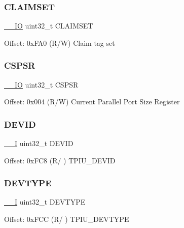\subsubsection{\texorpdfstring{CLAIMSET}{CLAIMSET}}
{\footnotesize\ttfamily \mbox{\hyperlink{core__sc300_8h_aec43007d9998a0a0e01faede4133d6be}{\+\_\+\+\_\+\+IO}} uint32\+\_\+t C\+L\+A\+I\+M\+S\+ET}

Offset\+: 0x\+F\+A0 (R/W) Claim tag set \mbox{\label{struct_t_p_i___type_a473c1ca66cec890b536d9c9a13a2d8c2}} 
\subsubsection{\texorpdfstring{CSPSR}{CSPSR}}
{\footnotesize\ttfamily \mbox{\hyperlink{core__sc300_8h_aec43007d9998a0a0e01faede4133d6be}{\+\_\+\+\_\+\+IO}} uint32\+\_\+t C\+S\+P\+SR}

Offset\+: 0x004 (R/W) Current Parallel Port Size Register \mbox{\label{struct_t_p_i___type_ac427ef592ac98a4e2d4b04d76ce02a4e}} 
\subsubsection{\texorpdfstring{DEVID}{DEVID}}
{\footnotesize\ttfamily \mbox{\hyperlink{core__sc300_8h_af63697ed9952cc71e1225efe205f6cd3}{\+\_\+\+\_\+I}} uint32\+\_\+t D\+E\+V\+ID}

Offset\+: 0x\+F\+C8 (R/ ) T\+P\+I\+U\+\_\+\+D\+E\+V\+ID \mbox{\label{struct_t_p_i___type_a67888dcdd12f305556012ba4c39cea19}} 
\subsubsection{\texorpdfstring{DEVTYPE}{DEVTYPE}}
{\footnotesize\ttfamily \mbox{\hyperlink{core__sc300_8h_af63697ed9952cc71e1225efe205f6cd3}{\+\_\+\+\_\+I}} uint32\+\_\+t D\+E\+V\+T\+Y\+PE}

Offset\+: 0x\+F\+CC (R/ ) T\+P\+I\+U\+\_\+\+D\+E\+V\+T\+Y\+PE \mbox{\label{struct_t_p_i___type_a511d496d51cf81ccef6e97fd1d5abe31}} 
